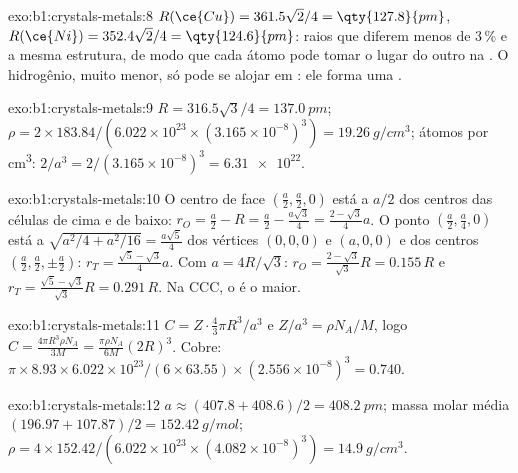 \begin{solution}{exo:b1:crystals-metals:8}
$R(\ce{Cu}) = 361.5\sqrt2/4 = \qty{127.8}{pm}$, $R(\ce{Ni}) = 352.4\sqrt2/4
= \qty{124.6}{pm}$: raios que diferem menos de 3\,\% e a mesma estrutura,
de modo que cada átomo pode tomar o lugar do outro na . O hidrogênio,
muito menor, só pode se alojar em : ele forma uma
.
\end{solution}

\begin{solution}{exo:b1:crystals-metals:9}
$R = 316.5\sqrt3/4 = \qty{137.0}{pm}$; $\rho = 2 \times 183.84/(6.022 \times
10^{23} \times (3.165 \times 10^{-8})^3) = \qty{19.26}{g/cm^3}$; átomos por
\unit{cm^3}: $2/a^3 = 2/(3.165 \times 10^{-8})^3 = \num{6.31e22}$.
\end{solution}

\begin{solution}{exo:b1:crystals-metals:10}
O centro de face $(\frac a2,\frac a2,0)$ está a $a/2$ dos centros das
células de cima e de baixo: $r_O = \frac a2 - R = \frac a2 - \frac{a\sqrt3}{4}
= \frac{2-\sqrt3}{4}a$. O ponto $(\frac a2,\frac a4,0)$ está a
$\sqrt{a^2/4 + a^2/16} = \frac{a\sqrt5}{4}$ dos vértices $(0,0,0)$ e
$(a,0,0)$ e dos centros $(\frac a2,\frac a2,\pm\frac a2)$:
$r_T = \frac{\sqrt5 - \sqrt3}{4}a$. Com $a = 4R/\sqrt3$:
$r_O = \frac{2-\sqrt3}{\sqrt3}R = 0.155\,R$ e
$r_T = \frac{\sqrt5-\sqrt3}{\sqrt3}R = 0.291\,R$. Na CCC, o  é o maior.
\end{solution}

\begin{solution}{exo:b1:crystals-metals:11}
$C = Z\cdot\frac43\pi R^3/a^3$ e $Z/a^3 = \rho N_A/M$, logo $C =
\frac{4\pi R^3\rho N_A}{3M} = \frac{\pi\rho N_A}{6M}(2R)^3$. Cobre:
$\pi \times 8.93 \times 6.022 \times 10^{23}/(6 \times 63.55) \times (2.556
\times 10^{-8})^3 = 0.740$.
\end{solution}

\begin{solution}{exo:b1:crystals-metals:12}
$a \approx (407.8 + 408.6)/2 = \qty{408.2}{pm}$; massa molar média $(196.97 +
107.87)/2 = \qty{152.42}{g/mol}$; $\rho = 4 \times 152.42/(6.022 \times
10^{23} \times (4.082 \times 10^{-8})^3) = \qty{14.9}{g/cm^3}$.
\end{solution}

